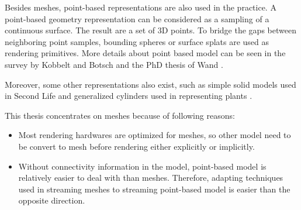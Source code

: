 \documentclass[11pt, a4paper]{report}
\begin{document}

    Besides meshes, point-based representations are also used in the practice.
    A point-based geometry representation can be considered as a 
    sampling of a continuous surface.  The result are a set of 3D points. 
    To bridge the gaps between neighboring point samples, 
    bounding spheres \cite{rusinkiewicz:qsplat, 364350} or surface splats \cite{383300} are used as rendering primitives. 
    More details about point based model can be seen in the survey by Kobbelt and Botsch \cite{DBLP:journals/cg/KobbeltB04} 
    and the PhD thesis of Wand \cite{wand:point}.  
    
    Moreover, some other representations also exist, such as simple solid models used in Second Life
    and generalized cylinders used in representing plants \cite{plant:seb, compact:mondet}.

    This thesis concentrates on meshes because of following reasons:
    \begin{itemize}
        \item Most rendering hardwares are optimized for meshes, so other model need to be convert
            to mesh before rendering either explicitly or implicitly. 
        \item Without connectivity information in the model, point-based model is relatively easier to deal with
            than meshes. Therefore, adapting techniques used in streaming meshes to streaming point-based model
            is easier than the opposite direction.
    \end{itemize}
\end{document}
